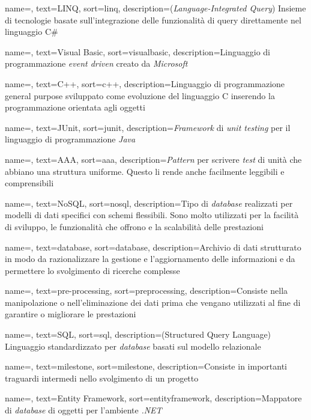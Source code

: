 {
    name=,
    text=LINQ,
    sort=linq,
    description={(\textit{Language-Integrated Query})
    Insieme di tecnologie basate sull'integrazione delle funzionalità di query direttamente nel linguaggio C\# \cite{site:wiki}}
}

{
    name=,
    text=Visual Basic,
    sort=visualbasic,
    description={Linguaggio di programmazione \textit{event driven} creato da \textit{Microsoft} \cite{site:wiki}}
}

{
    name=,
    text=C++,
    sort=c++,
    description={Linguaggio di programmazione
    general purpose sviluppato come evoluzione del linguaggio C inserendo la programmazione orientata agli oggetti}
}

{
    name=,
    text=JUnit,
    sort=junit,
    description={\textit{Framework} di \textit{unit testing} per il linguaggio di programmazione \textit{Java}}
}

{
    name=,
    text=AAA,
    sort=aaa,
    description={\textit{Pattern} per scrivere \textit{test} di unità che abbiano una struttura uniforme. Questo li rende anche facilmente leggibili e comprensibili}
}

{
    name=,
    text=NoSQL,
    sort=nosql,
    description={Tipo di \textit{database} realizzati per modelli di dati specifici con schemi flessibili. Sono molto utilizzati per la facilità di sviluppo, le funzionalità che offrono e la scalabilità delle prestazioni \cite{site:wiki}}
}

{
    name=,
    text=database,
    sort=database,
    description={Archivio di dati strutturato in modo da razionalizzare la gestione e l'aggiornamento delle informazioni e da permettere lo svolgimento di ricerche complesse \cite{site:def-db}}
}

{
    name=,
    text=pre-processing,
    sort=preprocessing,
    description={Consiste nella manipolazione o nell'eliminazione
    dei dati prima che vengano utilizzati al fine di
    garantire o migliorare le prestazioni \cite{site:wiki}}
}

{
    name=,
    text=SQL,
    sort=sql,
    description={(Structured Query Language) Linguaggio standardizzato per \textit{database} basati sul modello relazionale}
}

{
    name=,
    text=milestone,
    sort=milestone,
    description={Consiste in importanti traguardi intermedi nello svolgimento di un progetto}
}

{
    name=,
    text=Entity Framework,
    sort=entityframework,
    description={Mappatore di \textit{database} di oggetti per l'ambiente \textit{.NET} \cite{site:entity-framework-docs}}
}